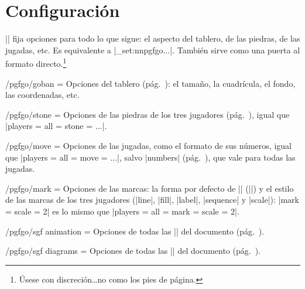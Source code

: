 \section{Configuración}
\label{sec:configuracion}

|| fija opciones para todo lo que sigue: el aspecto del tablero, de las piedras, de las jugadas, etc. Es equivalente a |\keys_set:nn{pgfgo}{...}|. También sirve como una puerta al formato directo.\footnote{Úsese con discreción\dots no como los pies de página.}

\begin{command}{\pgfgoset{}}
\end{command}

\begin{key}{/pgfgo/goban = }
	Opciones del tablero (pág.~\pageref{sec:tablero}): el tamaño, la cuadrícula, el fondo, las coordenadas, etc.
\end{key}

\begin{key}{/pgfgo/stone = }
	Opciones de las piedras de los tres jugadores (pág.~\pageref{sec:piedras}), igual que |players = {all = {stone = {...}}}|.
\end{key}

\begin{key}{/pgfgo/move = }
	Opciones de las jugadas, como el formato de sus números, igual que |players = {all = {move = {...}}}|, salvo |numbers| (pág.~\pageref{subsec:movimientos}), que vale para todas las jugadas.
\end{key}

\begin{key}{/pgfgo/mark = }
	Opciones de las marcas: la forma por defecto de |\marks| (||) y el estilo de las marcas de los tres jugadores (|line|, |fill|, |label|, |sequence| y |scale|): |mark = {scale = 2}| es lo mismo que |players = {all = {mark = {scale = 2}}}|.
\end{key}

\begin{key}{/pgfgo/sgf animation = }
	Opciones de todas las |\sgfanimation| del documento (pág.~\pageref{subsec:sgfanimacion}).
\end{key}

\begin{key}{/pgfgo/sgf diagrams = }
	Opciones de todas las |\sgfdiagrams| del documento (pág.~\pageref{subsec:sgfdiagramas}).
\end{key}

